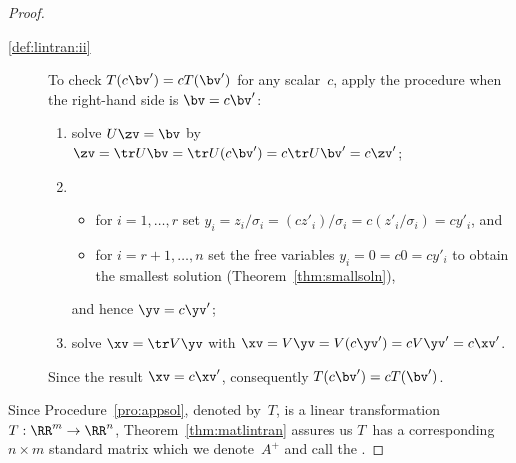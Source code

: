 \begin{proof}
\begin{description}
\item[\ref{def:lintran:ii}]  
To check \(T(c\bv')=cT(\bv')\) for any scalar~\(c\), apply the procedure when the right-hand side is \(\bv=c\bv'\):
\begin{enumerate}
\item solve \(U\zv=\bv\) by \(\zv=\tr U\bv=\tr U(c\bv')=c\tr U\bv'=c\zv'\);
\item \begin{itemize}
\item for \(i=1,\ldots,r\) set \(y_i=z_i/\sigma_i=(cz'_i)/\sigma_i=c(z'_i/\sigma_i)=cy'_i\), and
\item for \(i=r+1,\ldots,n\) set the free variables \(y_i=0=c0=cy'_i\) to obtain the smallest solution (Theorem~\ref{thm:smallsoln}),
\end{itemize}
and hence \(\yv=c\yv'\);
\item solve \(\xv=\tr V\yv\) with \(\xv=V\yv=V(c\yv')=cV\yv'=c\xv'\).
\end{enumerate}
Since the result \(\xv=c\xv'\), consequently \(T(c\bv')=cT(\bv')\).
\end{description}
Since Procedure~\ref{pro:appsol}, denoted by~\(T\), is a linear transformation \(T:\RR^m\to\RR^n\), Theorem~\ref{thm:matlintran} assures us \(T\)~has a corresponding \(n\times m\) standard matrix which we denote~\(A^+\) and call the .
\end{proof}




